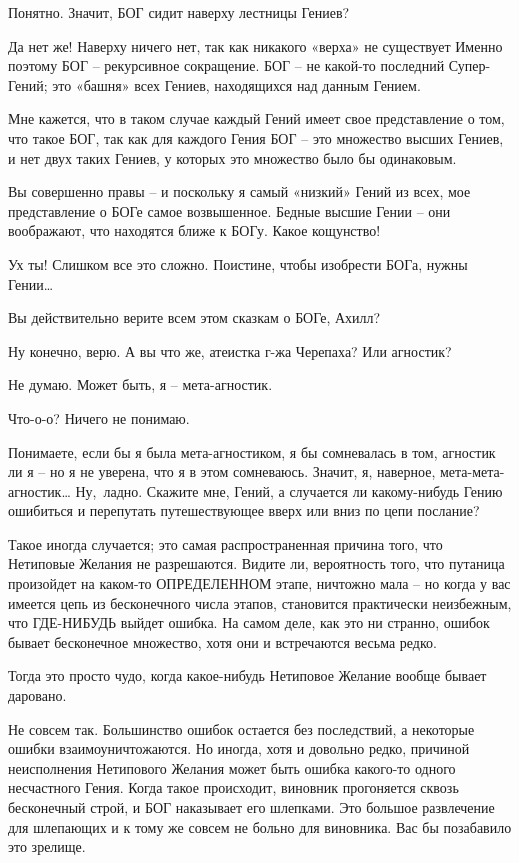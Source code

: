 \documentclass[../main.tex]{subfiles}
\begin{document}
\begin{Dialogue}
\begin{sublevel}
\begin{sublevel}
 Понятно. Значит, БОГ сидит наверху лестницы Гениев?

 Да нет же! Наверху ничего нет, так как никакого «верха» не существует Именно поэтому БОГ \--- рекурсивное сокращение. БОГ \--- не какой-то последний Супер-Гений; это «башня» всех Гениев, находящихся над данным Гением.

 Мне кажется, что в таком случае каждый Гений имеет свое представление о том, что такое БОГ, так как для каждого Гения БОГ \--- это множество высших Гениев, и нет двух таких Гениев, у которых это множество было бы одинаковым.

 Вы совершенно правы \--- и поскольку я самый «низкий» Гений из всех, мое представление о БОГе самое возвышенное. Бедные высшие Гении \--- они воображают, что находятся ближе к БОГу. Какое кощунство!

 Ух ты! Слишком все это сложно. Поистине, чтобы изобрести БОГа, нужны Гении\ldots{}

 Вы действительно верите всем этом сказкам о БОГе, Ахилл?

 Ну конечно, верю. А вы что же, атеистка г-жа Черепаха? Или агностик?

 Не думаю. Может быть, я \--- мета-агностик.

 Что-о-о? Ничего не понимаю.

 Понимаете, если бы я была мета-агностиком, я бы сомневалась в том, агностик ли я \--- но я не уверена, что я в этом сомневаюсь. Значит, я, наверное, мета-мета-агностик\ldots{} Ну,~ладно. Скажите мне, Гений, а случается ли какому-нибудь Гению ошибиться и перепутать путешествующее вверх или вниз по цепи послание?

 Такое иногда случается; это самая распространенная причина того, что Нетиповые Желания не разрешаются. Видите ли, вероятность того, что путаница произойдет на каком-то ОПРЕДЕЛЕННОМ этапе, ничтожно мала \--- но когда у вас имеется цепь из бесконечного числа этапов, становится практически неизбежным, что ГДЕ-НИБУДЬ выйдет ошибка. На самом деле, как это ни странно, ошибок бывает бесконечное множество, хотя они и встречаются весьма редко.

 Тогда это просто чудо, когда какое-нибудь Нетиповое Желание вообще бывает даровано.

 Не совсем так. Большинство ошибок остается без последствий, а некоторые ошибки взаимоуничтожаются. Но иногда, хотя и довольно редко, причиной неисполнения Нетипового Желания может быть ошибка какого-то одного несчастного Гения. Когда такое происходит, виновник прогоняется сквозь бесконечный строй, и БОГ наказывает его шлепками. Это большое развлечение для шлепающих и к тому же совсем не больно для виновника. Вас бы позабавило это зрелище.


\end{sublevel}
\end{sublevel}
\end{Dialogue}
\end{document}
